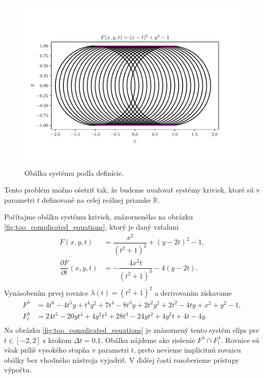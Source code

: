 \begin{figure}[H]
	\centering
	\includegraphics{images/system_with_correct_envelope.pdf}
	\caption{Obálka systému podľa definície.}
	\label{fig:system_with_correct_envelope}
\end{figure}

Tento problém možno ošetriť tak, že budeme uvažovať systémy kriviek, ktoré sú v parametri $t$ definované na celej reálnej priamke $\mathbb{R}$. 

\begin{example}
\label{example:too_complicated_equations}
Počítajme obálku systému kriviek, znázorneného na obrázku \ref{fig:too_complicated_equations}, ktorý je daný vzťahmi
\begin{align*}
F(x,y, t) &= \dfrac{x^2}{(t^2 + 1)^2} + (y - 2t)^2 - 1, \\
\dfrac{\partial F}{\partial t}(x, y, t) &= -\dfrac{4x^2t}{\left(t^2+1\right)^3}-4\left(y-2t\right). \\
\end{align*}
Vynásobením prvej rovnice $ \lambda(t) = (t^2 + 1)^2$ a derivovaním získavame
\begin{align*}
F^\lambda &= 4 t^6 - 4 t^5 y + t^4 y^2 + 7 t^4 - 8 t^3 y + 2 t^2 y^2 + 2 t^2 - 4 t y + x^2 + y^2 - 1, \\
F_t^\lambda &= 24t^5-20yt^4+4y^2t^3+28t^3-24yt^2+4y^2t+4t-4y. \\
\end{align*}
Na obrázku \ref{fig:too_complicated_equations} je znázornený tento systém elíps pre $t \in [-2,2]$ s krokom $\Delta t=0.1$. Obálku nájdeme ako riešenie $F^\lambda \cap F_t^\lambda. $ Rovnice sú však príliš vysokého stupňa v parametri $t$, preto nevieme implicitnú rovnicu obálky bez vhodného nástroja vyjadriť. V ďalšej časti rozoberieme prístupy výpočtu.
\end{example}

